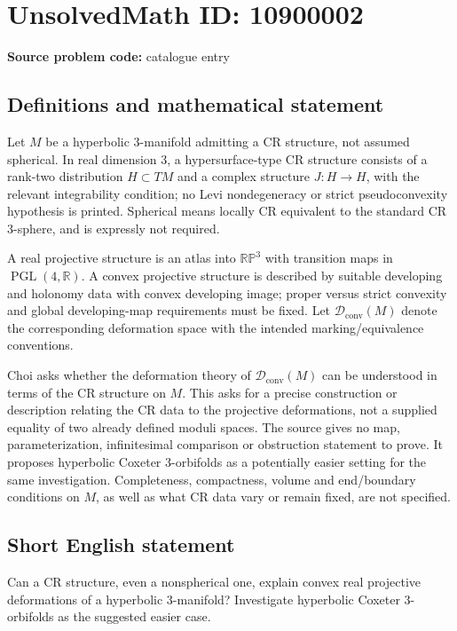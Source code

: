 \documentclass[11pt]{article}
\newcommand{\R}{\mathbb{R}}
\newcommand{\PP}{\mathbb{P}}
\begin{document}
\section*{UnsolvedMath ID: 10900002}
\textbf{Source problem code:} catalogue entry
\subsection{Definitions and mathematical statement}
Let \(M\) be a hyperbolic \(3\)-manifold admitting a CR structure, not assumed spherical. In real dimension \(3\), a hypersurface-type CR structure consists of a rank-two distribution \(H\subset TM\) and a complex structure \(J:H\to H\), with the relevant integrability condition; no Levi nondegeneracy or strict pseudoconvexity hypothesis is printed. Spherical means locally CR equivalent to the standard CR \(3\)-sphere, and is expressly not required.

A real projective structure is an atlas into \(\R\PP^3\) with transition maps in \(\operatorname{PGL}(4,\R)\). A convex projective structure is described by suitable developing and holonomy data with convex developing image; proper versus strict convexity and global developing-map requirements must be fixed. Let \(\mathcal D_{\mathrm{conv}}(M)\) denote the corresponding deformation space with the intended marking/equivalence conventions.

Choi asks whether the deformation theory of \(\mathcal D_{\mathrm{conv}}(M)\) can be understood in terms of the CR structure on \(M\). This asks for a precise construction or description relating the CR data to the projective deformations, not a supplied equality of two already defined moduli spaces. The source gives no map, parameterization, infinitesimal comparison or obstruction statement to prove. It proposes hyperbolic Coxeter \(3\)-orbifolds as a potentially easier setting for the same investigation. Completeness, compactness, volume and end/boundary conditions on \(M\), as well as what CR data vary or remain fixed, are not specified.
\subsection{Short English statement}
Can a CR structure, even a nonspherical one, explain convex real projective deformations of a hyperbolic \(3\)-manifold? Investigate hyperbolic Coxeter \(3\)-orbifolds as the suggested easier case.
\end{document}
